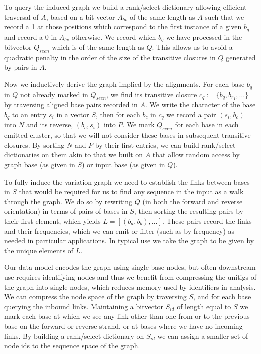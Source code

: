 \documentclass[a4paper,12pt,numbered,oneside]{Classes/PhDThesisPSnPDF}
\begin{document}
To query the induced graph we build a rank/select dictionary allowing efficient traversal of $A$, based on a bit vector $A_{bv}$ of the same length as $A$ such that we record a 1 at those positions which correspond to the first instance of a given $b_{q}$ and record a 0 in $A_{bv}$ otherwise. 
We record which $b_{q}$ we have processed in the bitvector $Q_{seen}$ which is of the same length as $Q$.
This allows us to avoid a quadratic penalty in the order of the size of the transitive closures in $Q$ generated by pairs in $A$.

Now we inductively derive the graph implied by the alignments.
For each base $b_{q}$ in $Q$ not already marked in $Q_{seen}$, we find its transitive closure $c_{q} := \{b_{q}, b_{r_{1}}, \ldots \}$ by traversing aligned base pairs recorded in $A$.
We write the character of the base $b_{q}$ to an entry $s_i$ in a vector $S$, then for each $b_{c}$ in $c_{q}$ we record a pair $(s_{i}, b_{c})$ into $N$ and its reverse, $(b_{c}, s_{i})$ into $P$.
We mark $Q_{seen}$ for each base in each emitted cluster, so that we will not consider these bases in subsequent transitive closures.
By sorting $N$ and $P$ by their first entries, we can build rank/select dictionaries on them akin to that we built on $A$ that allow random access by graph base (as given in $S$) or input base (as given in $Q$).

To fully induce the variation graph we need to establish the links between bases in $S$ that would be required for us to find any sequence in the input as a walk through the graph.
We do so by rewriting $Q$ (in both the forward and reverse orientation) in terms of pairs of bases in $S$, then sorting the resulting pairs by their first element, which yields $L = [(b_{a}, b_{b}), \ldots ]$.
These pairs record the links and their frequencies, which we can emit or filter (such as by frequency) as needed in particular applications.
In typical use we take the graph to be given by the unique elements of $L$.

Our data model encodes the graph using single-base nodes, but often downstream use requires identifying nodes and thus we benefit from compressing the unitigs of the graph into single nodes, which reduces memory used by identifiers in analysis.
We can compress the node space of the graph by traversing $S$, and for each base querying the inbound links.
Maintaining a bitvector $S_{id}$ of length equal to $S$ we mark each base at which we see any link other than one from or to the previous base on the forward or reverse strand, or at bases where we have no incoming links.
By building a rank/select dictionary on $S_{id}$ we can assign a smaller set of node ids to the sequence space of the graph.
\end{document}
